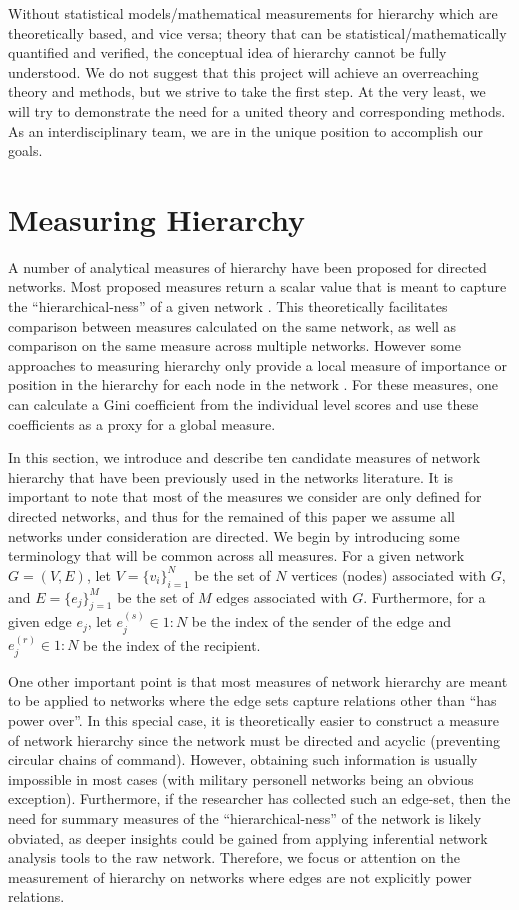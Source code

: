 \documentclass[3p,times]{elsarticle}
\begin{document}
Without statistical models/mathematical measurements for hierarchy which are theoretically based, and vice versa; theory that can be statistical/mathematically quantified and verified, the conceptual idea of hierarchy cannot be fully understood. We do not suggest that this project will achieve an overreaching theory and methods, but we strive to take the first step. At the very least, we will try to demonstrate the need for a united theory and corresponding methods. As an interdisciplinary team, we are in the unique position to accomplish our goals.

\section{Measuring Hierarchy}
A number of analytical measures of hierarchy have been proposed for directed networks. Most proposed measures return a scalar value that is meant to capture the ``hierarchical-ness'' of a given network \cite{eigen, between,kendall, landau, GRC}. This theoretically facilitates comparison between measures calculated on the same network, as well as comparison on the same measure across multiple networks. However some approaches to measuring hierarchy only provide a local measure of importance or position in the hierarchy for each node in the network \cite{key}. For these measures, one can calculate a Gini coefficient \cite{Yitzhaki1979} from the individual level scores and use these coefficients as a proxy for a global measure. 

In this section, we introduce and describe ten candidate measures of network hierarchy that have been previously used in the networks literature. It is important to note that most of the measures we consider are only defined for directed networks, and thus for the remained of this paper we assume all networks under consideration are directed. We begin by introducing some terminology that will be common across all measures. For a given network $G=(V,E)$, let $V=\{v_i\}_{i=1}^N$ be the set of $N$ vertices (nodes) associated with $G$, and $E=\{e_j\}_{j=1}^M$ be the set of $M$ edges associated with $G$. Furthermore, for a given edge $e_j$, let $e_j^{(s)} \in 1:N$ be the index of the sender of the edge and $e_j^{(r)} \in 1:N$ be the index of the recipient. 

One other important point is that most measures of network hierarchy are meant to be applied to networks where the edge sets capture relations other than ``has power over''. In this special case, it is theoretically easier to construct a measure of network hierarchy since the network must be directed and acyclic (preventing circular chains of command). However, obtaining such information is usually impossible in most cases (with military personell networks being an obvious exception). Furthermore, if the researcher has collected such an edge-set, then the need for summary measures of the ``hierarchical-ness'' of the network is likely obviated, as deeper insights could be gained from applying inferential network analysis tools to the raw network. Therefore, we focus or attention on the measurement of hierarchy on networks where edges are not explicitly power relations.
\end{document}
